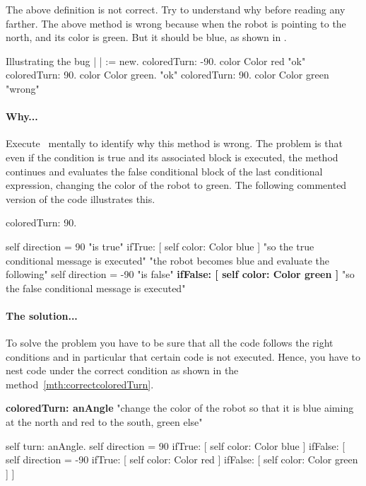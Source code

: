 The above definition is not correct. Try to understand why before reading any farther. 
The above method is wrong because when the robot is pointing to the north, and its color is green. But it should be blue, as shown in .  

\begin{scriptwithtitle}{Illustrating the bug}\label{scr:illustbug} 
| \caro |
\caro := \Turtle new.
\caro coloredTurn: -90.
\caro color \pr  Color red           "ok"
\caro coloredTurn: 90.
\caro color \pr Color green.      "ok"
\caro coloredTurn: 90.
\caro color \pr Color green      "wrong"
\end{scriptwithtitle}


\paragraph{Why...} Execute~ mentally to identify why this method is wrong. The problem is that even if the condition   is true and its associated block is executed, the method continues and evaluates the false conditional block of the last conditional expression, changing the color of the robot to green. 
The following commented version of the code illustrates this.


\begin{nalltt}
\caro coloredTurn: 90.

   self direction = 90                                        \textrm{"is true"}
       ifTrue: [ self color: Color blue ]                 \textrm{"so the true conditional message is executed"}        
                                                                             \textrm{"the robot becomes blue and evaluate the following"}
   self direction = -90                                        \textrm{"is false"} 
        \textbf{ifFalse: [ self color: Color green ]}   \textrm{"so the false conditional message is executed"}
\end{nalltt}


\paragraph{The solution...} To solve the problem you have to be sure that all the code follows the right conditions and in particular that certain code is not executed. Hence, you have to nest code under the correct condition as shown in the method~\ref{mth:correctcoloredTurn}.

\begin{method}\label{mth:correctcoloredTurn}
\textbf{coloredTurn: anAngle}
   "change the color of the robot so that it is blue aiming at the 
   north and red to the south, green else"

   self turn: anAngle.
   self direction = 90
      ifTrue: [ self color: Color blue ]
      ifFalse: [ self direction = -90
         ifTrue: [ self color: Color red ]
         ifFalse: [ self color: Color green ] ]
\end{method}

